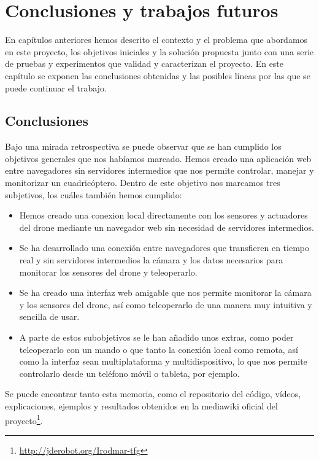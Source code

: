 \chapter{Conclusiones y trabajos futuros}

En capítulos anteriores hemos descrito el contexto y el problema que abordamos en este proyecto, los objetivos iniciales y la solución propuesta junto con una serie de pruebas y experimentos que validad y caracterizan el proyecto. En este capítulo se exponen las conclusiones obtenidas y las posibles líneas por las que se puede continuar el trabajo.\\

\section{Conclusiones}

Bajo una mirada retrospectiva se puede observar que se han cumplido los objetivos generales que nos habíamos marcado. Hemos creado una aplicación web entre navegadores sin servidores intermedios que nos permite controlar, manejar y monitorizar un cuadricóptero. Dentro de este objetivo nos marcamos tres subjetivos, los cuáles también hemos cumplido:\\

\begin{itemize}
\item Hemos creado una conexion local directamente con los sensores y actuadores del drone mediante un navegador web sin necesidad de servidores intermedios.
\item Se ha desarrollado una conexión entre navegadores que transfieren en tiempo real y sin servidores intermedios la cámara y los datos necesarios para monitorar los sensores del drone y teleoperarlo.
\item Se ha creado una interfaz web amigable que nos permite monitorar la cámara y los sensores del drone, así como teleoperarlo de una manera muy intuitiva y sencilla de usar.
\item A parte de estos subobjetivos se le han añadido unos extras, como poder teleoperarlo con un mando o que tanto la conexión local como remota, así como la interfaz sean multiplataforma y multidispositivo, lo que nos permite controlarlo desde un teléfono móvil o tableta, por ejemplo.
\end{itemize} 

Se puede encontrar tanto esta memoria, como el repositorio del código, vídeos, explicaciones, ejemplos y resultados obtenidos en la mediawiki oficial del proyecto\footnote{\url{http://jderobot.org/Irodmar-tfg}}\cite{Mediawiki}.


